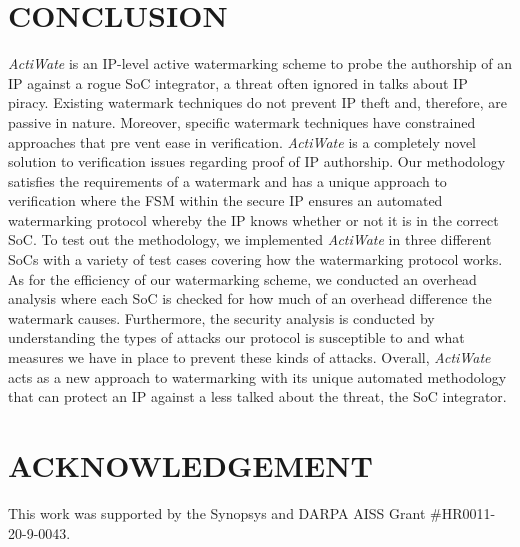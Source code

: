 \documentclass[onecolumn]{IEEEtran}
\begin{document}
\section{CONCLUSION}
\label{sec6}
 \textit{ActiWate} is an IP-level active watermarking scheme to probe the
authorship of an IP against a rogue SoC integrator, a threat often
ignored in talks about IP piracy. Existing watermark techniques do
not prevent IP theft and, therefore, are passive in nature. Moreover,
specific watermark techniques have constrained approaches that pre
vent ease in verification. \textit{ActiWate} is a completely novel solution to
verification issues regarding proof of IP authorship. Our methodology
satisfies the requirements of a watermark and has a unique approach
to verification where the FSM within the secure IP ensures an
automated watermarking protocol whereby the IP knows whether
or not it is in the correct SoC. To test out the methodology, we
implemented \textit{ActiWate} in three different SoCs with a variety of test
cases covering how the watermarking protocol works. As for the
efficiency of our watermarking scheme, we conducted an overhead
analysis where each SoC is checked for how much of an overhead
difference the watermark causes. Furthermore, the security analysis
is conducted by understanding the types of attacks our protocol
is susceptible to and what measures we have in place to prevent
these kinds of attacks. Overall, \textit{ActiWate} acts as a new approach to
watermarking with its unique automated methodology that can protect
an IP against a less talked about the threat, the SoC integrator.



\section*{ACKNOWLEDGEMENT}
This work was supported by the Synopsys and DARPA AISS Grant
\#HR0011-20-9-0043.


 
\end{document}
